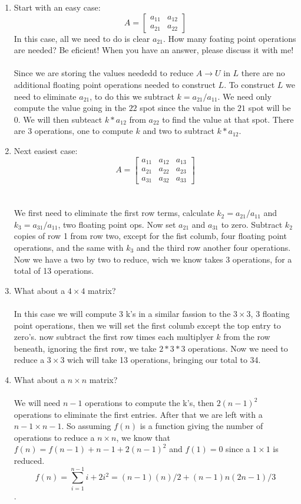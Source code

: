 \documentclass[12pt]{article}
\theoremstyle{homework}
\begin{document}
\begin{enumerate}[(1)]
\item
Start with an easy case:
$$A =
\begin{bmatrix}
a_{11} & a_{12}\\
a_{21} & a_{22}
\end{bmatrix}
$$
In this case, all we need to do is clear $a_{21}$. How many foating point operations are needed?  Be eficient! When you have an answer, please discuss it with me!\\\\
Since we are storing the values neededd to reduce $A\rightarrow U$ in $L$ there are no additional floating point operations needed to construct $L$.  To construct $L$ we need to eliminate $a_{21}$, to do this we subtract $k=a_{21}/a_{11}$.  We need only compute the value going in the $22$ spot since the value in the $21$ spot will be 0.  We will then subteact $k*a_{12}$ from $a_{22}$ to find the value at that spot.  There are 3 operations, one to compute $k$ and two to subtract $k*a_{12}$.
\item
Next easiest case:
$$A =\begin{bmatrix}
a_{11}& a_{12}& a_{13}\\
a_{21}& a_{22}& a_{23}\\
a_{31}& a_{32}& a_{33}
\end{bmatrix}$$\\\\
We first need to eliminate the first row terms, calculate $k_2=a_{21}/a_{11}$ and $k_3=a_{31}/a_{11}$, two floating point ops.  Now set $a_{21}$ and $a_{31}$ to zero.  Subtract $k_2$ copies of row 1 from row two, except for the fist columb, four floating point operations, and the same with $k_3$ and the third row another four operations.  Now we have a two by two to reduce, wich we know takes 3 operations, for a total of 13 operations.
\item
What about a $4\times 4$ matrix?\\\\
In this case we will compute 3 k's in a similar fassion to the $3\times 3$, 3 floating point operations, then we will set the first columb except the top entry to zero's.  now subtract the first row times each multiplyer $k$ from the row beneath, ignoring the first row, we take $2*3*3$ operations.  Now we need to reduce a $3\times 3$ wich will take 13 operations, bringing our total to 34.
\item
What about a $n\times n$ matrix?\\\\
We will need $n-1$ operations to compute the k's, then $2(n-1)^2$ operations to eliminate the first entries.  After that we are left with a $n-1\times n-1$.  So assuming $f(n)$ is a function giving the number of operations to reduce a $n\times n$, we know that $f(n)=f(n-1)+n-1+2(n-1)^2$ and $f(1)=0$ since a $1\times 1$ is reduced.
$$f(n)=\sum_{i=1}^{n-1} i+2i^2=(n-1)(n)/2+(n-1)n(2n-1)/3$$.
\end{enumerate}
\end{document}
